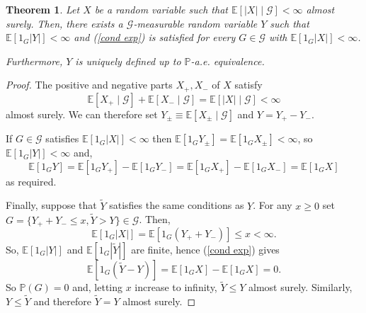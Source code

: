 \documentclass[12pt]{article}
\newtheorem{theorem}{Theorem}
\begin{document}
\begin{theorem}
Let $X$ be a random variable such that $\mathbb{E}[|X|\mid\mathcal{G}]<\infty$ almost surely. Then, there exists a $\mathcal{G}$-measurable random variable $Y$ such that $\mathbb{E}[1_G|Y|]<\infty$ and (\ref{cond exp}) is satisfied for every $G\in\mathcal{G}$ with $\mathbb{E}[1_G|X|]<\infty$.

Furthermore, $Y$ is uniquely defined up to $\mathbb{P}$-a.e. equivalence.
\end{theorem}
\begin{proof}
The positive and negative parts $X_+,X_-$ of $X$ satisfy
\begin{equation*}
\mathbb{E}[X_+\mid\mathcal{G}]+\mathbb{E}[X_-\mid\mathcal{G}]=\mathbb{E}[|X|\mid\mathcal{G}]<\infty
\end{equation*}
almost surely. We can therefore set $Y_{\pm}\equiv\mathbb{E}[X_\pm\mid\mathcal{G}]$ and $Y=Y_+-Y_-$.

If $G\in\mathcal{G}$ satisfies $\mathbb{E}[1_G|X|]<\infty$ then $\mathbb{E}[1_GY_\pm]=\mathbb{E}[1_GX_\pm]<\infty$, so $\mathbb{E}[1_G|Y|]<\infty$ and,
\begin{equation*}
\mathbb{E}[1_GY]=\mathbb{E}[1_GY_+]-\mathbb{E}[1_GY_-]=\mathbb{E}[1_GX_+]-\mathbb{E}[1_GX_-]=\mathbb{E}[1_GX]
\end{equation*}
as required.

Finally, suppose that $\tilde Y$ satisfies the same conditions as $Y$. For any $x\ge 0$ set $G=\{Y_++Y_-\le x,\tilde Y> Y\}\in\mathcal{G}$.
Then,
\begin{equation*}
\mathbb{E}[1_G|X|]=\mathbb{E}[1_G(Y_++Y_-)]\le x<\infty.
\end{equation*}
So, $\mathbb{E}[1_G|Y|]$ and $\mathbb{E}[1_G|\tilde Y|]$ are finite, hence (\ref{cond exp}) gives
\begin{equation*}
\mathbb{E}[1_G(\tilde Y - Y)]=\mathbb{E}[1_GX]-\mathbb{E}[1_GX]=0.
\end{equation*}
So $\mathbb{P}(G)=0$ and, letting $x$ increase to infinity, $\tilde Y\le Y$ almost surely. Similarly, $Y\le\tilde Y$ and therefore $\tilde Y=Y$ almost surely.
\end{proof}

\end{document}
